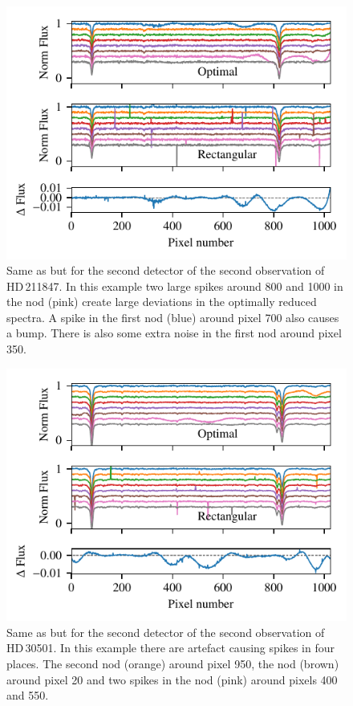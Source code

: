   \begin{figure}
     \centering
     \includegraphics[width=0.7\linewidth]{figures/appendix/bp_plots/extraction_comparision_HD211847-2_chip_2}
     \caption{Same as  but for the second detector of the second observation of {HD\,211847}. In this example two large spikes around 800 and 1000 in the  nod (pink) create large deviations in the optimally reduced spectra. A spike in the first nod (blue) around pixel 700 also causes a bump. There is also some extra noise in the first nod around pixel 350.}
     \label{fig:artefact_example6}
 \end{figure}
  \begin{figure}
    \centering
    \includegraphics[width=0.7\linewidth]{figures/appendix/bp_plots/extraction_comparision_HD30501-2b_chip_2}
    \caption{Same as  but for the second detector of the second observation of {HD\,30501}. In this example there are artefact causing spikes in four places. The second nod (orange) around pixel 950, the  nod (brown) around pixel 20 and two spikes in the  nod (pink) around pixels 400 and 550.}
    \label{fig:artefact_example7}
\end{figure}
